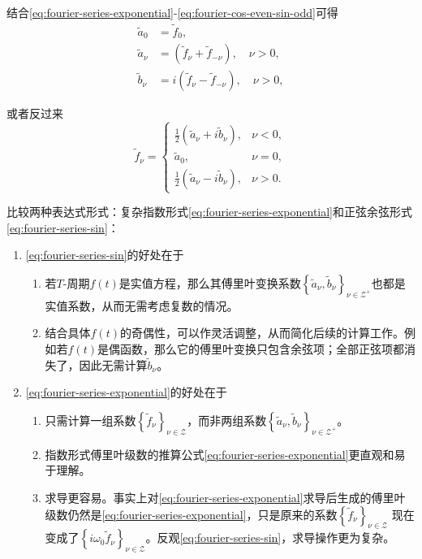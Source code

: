 结合\eqref{eq:fourier-series-exponential}-\eqref{eq:fourier-cos-even-sin-odd}可得
\begin{equation}
  \label{eq:fourier-series-representation-relation-coef}
  \begin{split}
    \tilde{a}_{0} & = \tilde{f}_{0}, \\
    \tilde{a}_{\nu} & = \left( \tilde{f}_{\nu} + \tilde{f}_{- \nu} \right), \quad \nu > 0, \\
    \tilde{b}_{\nu} & = i \left( \tilde{f}_{\nu} - \tilde{f}_{- \nu} \right), \quad \nu > 0,
  \end{split}
\end{equation}

或者反过来
\begin{equation}
  \label{eq:fourier-series-representation-relation-coeff}
  \tilde{f}_{\nu} =
  \begin{cases}
  \frac{1}{2} \left( \tilde{a}_{\nu} + i \tilde{b}_{\nu} \right), & \nu < 0, \\
  \tilde{a}_{0}, & \nu = 0, \\
  \frac{1}{2} \left( \tilde{a}_{\nu} - i \tilde{b}_{\nu} \right), & \nu > 0.
  \end{cases}
\end{equation}

比较两种表达式形式：复杂指数形式\eqref{eq:fourier-series-exponential}和正弦余弦形式\eqref{eq:fourier-series-sin}：
\begin{enumerate}
  \item \eqref{eq:fourier-series-sin}的好处在于
  \begin{enumerate}
    \item 若$T$-周期$f(t)$是实值方程，那么其傅里叶变换系数$\left\{ \tilde{a}_{\nu}, \tilde{b}_{\nu} \right\}_{\nu \in \mathcal{Z}^{+}}$也都是实值系数，从而无需考虑复数的情况。
    \item 结合具体$f(t)$的奇偶性，可以作灵活调整，从而简化后续的计算工作。例如若$f(t)$是偶函数，那么它的傅里叶变换只包含余弦项；全部正弦项都消失了，因此无需计算$\tilde{b}_{\nu}$。
  \end{enumerate}
  \item \eqref{eq:fourier-series-exponential}的好处在于
  \begin{enumerate}
    \item 只需计算一组系数$\left\{ \tilde{f}_{\nu} \right\}_{\nu \in \mathcal{Z}}$，而非两组系数$\left\{ \tilde{a}_{\nu}, \tilde{b}_{\nu} \right\}_{\nu \in \mathcal{Z}^{+}}$。
    \item 指数形式傅里叶级数的推算公式\eqref{eq:fourier-series-exponential}更直观和易于理解。
    \item 求导更容易。事实上对\eqref{eq:fourier-series-exponential}求导后生成的傅里叶级数仍然是\eqref{eq:fourier-series-exponential}，只是原来的系数$\left\{ \tilde{f}_{\nu} \right\}_{\nu \in \mathcal{Z}}$
    现在变成了$\left\{ i \omega_{0} \tilde{f}_{\nu} \right\}_{\nu \in \mathcal{Z}}$。反观\eqref{eq:fourier-series-sin}，求导操作更为复杂。
  \end{enumerate}
\end{enumerate}

